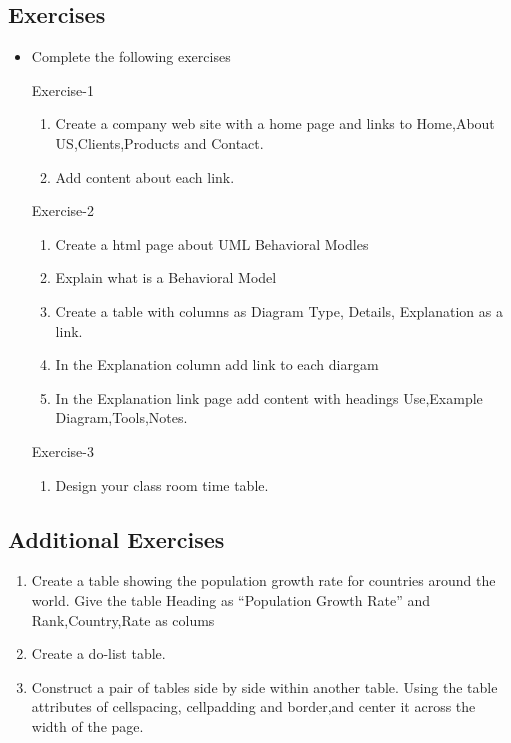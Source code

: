 \documentclass[11pt,a4paper]{article}
\begin{document}
\subsection*{Exercises}
\begin{itemize}
\item Complete the following  exercises

\item[Exercise-1]\
\begin{enumerate}[label=\bfseries Q\arabic*:]\itemsep10pt
\item Create a company web site with a home page and links to Home,About US,Clients,Products and Contact.
\item Add content about each link.
\end{enumerate}

\item[Exercise-2]\
\begin{enumerate}[label=\bfseries Q\arabic*:]\itemsep10pt
\item Create a html page about UML Behavioral Modles
\item Explain what is a Behavioral Model
\item Create a table with columns as Diagram Type, Details, Explanation as a link.
\item In the Explanation column add link to each diargam
\item In the Explanation link page add content with headings Use,Example Diagram,Tools,Notes.
\end{enumerate}

\item[Exercise-3]\
\begin{enumerate}[label=\bfseries Q\arabic*:]\itemsep10pt
\item Design your class room time table.
\end{enumerate}
\end{itemize}

\subsection*{Additional Exercises}
\begin{enumerate}
\item Create a table showing the population growth rate for countries around the world.
Give the table Heading as ``Population Growth Rate'' and Rank,Country,Rate as colums
\item Create a do-list table.
\item Construct a pair of tables side by side within another table. Using the table attributes of cellspacing, cellpadding and border,and center it across the width of the page.
\end{enumerate}
\end{document}
